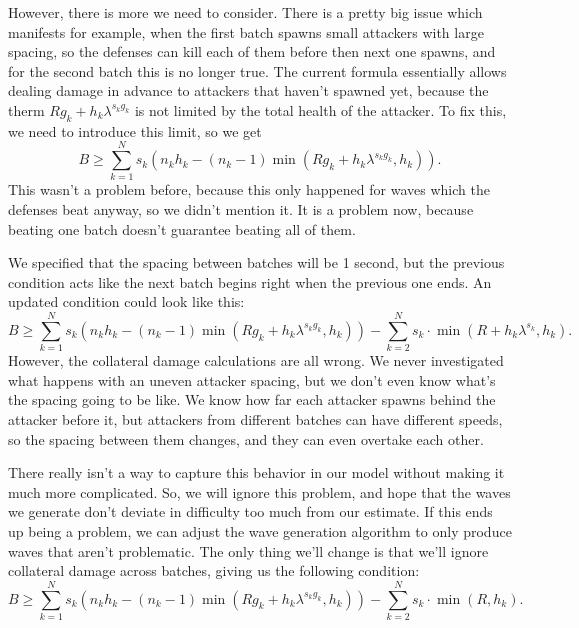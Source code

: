 However, there is more we need to consider.
There is a pretty big issue which manifests for example, when the first batch spawns small attackers with large spacing, so the defenses can kill each of them before then next one spawns, and for the second batch this is no longer true.
The current formula essentially allows dealing damage in advance to attackers that haven't spawned yet, because the therm $R g_k + h_k \lambda^{s_k g_k}$ is not limited by the total health of the attacker.
To fix this, we need to introduce this limit, so we get
\begin{equation*}
    B \geq \sum_{k=1}^{N} s_k (n_k h_k - (n_k - 1)\min(R g_k + h_k \lambda^{s_k g_k}, h_k)).
\end{equation*}
This wasn't a problem before, because this only happened for waves which the defenses beat anyway, so we didn't mention it.
It is a problem now, because beating one batch doesn't guarantee beating all of them.

We specified that the spacing between batches will be 1 second, but the previous condition acts like the next batch begins right when the previous one ends.
An updated condition could look like this:
\begin{equation*}
    B \geq \sum_{k=1}^{N} s_k (n_k h_k - (n_k - 1)\min(R g_k + h_k \lambda^{s_k g_k}, h_k)) - \sum_{k=2}^{N} s_k \cdot \min(R + h_k \lambda^{s_k}, h_k).
\end{equation*}
However, the collateral damage calculations are all wrong.
We never investigated what happens with an uneven attacker spacing, but we don't even know what's the spacing going to be like.
We know how far each attacker spawns behind the attacker before it, but attackers from different batches can have different speeds, so the spacing between them changes, and they can even overtake each other.

There really isn't a way to capture this behavior in our model without making it much more complicated.
So, we will ignore this problem, and hope that the waves we generate don't deviate in difficulty too much from our estimate.
If this ends up being a problem, we can adjust the wave generation algorithm to only produce waves that aren't problematic.
The only thing we'll change is that we'll ignore collateral damage across batches, giving us the following condition:
\begin{equation}
    B \geq \sum_{k=1}^{N} s_k (n_k h_k - (n_k - 1)\min(R g_k + h_k \lambda^{s_k g_k}, h_k)) - \sum_{k=2}^{N} s_k \cdot \min(R, h_k).
\end{equation}


